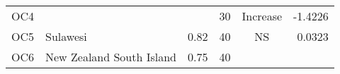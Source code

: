 \documentclass[]{article}
\begin{document}
\begin{longtable}[]{@{}clrccr@{}}
\begin{minipage}[t]{0.08\columnwidth}
OC4\strut
\end{minipage} & \begin{minipage}[t]{0.29\columnwidth}\raggedright\strut
\strut
\end{minipage} & \begin{minipage}[t]{0.11\columnwidth}\raggedleft\strut
\strut
\end{minipage} & \begin{minipage}[t]{0.10\columnwidth}\centering\strut
30\strut
\end{minipage} & \begin{minipage}[t]{0.16\columnwidth}\centering\strut
Increase\strut
\end{minipage} & \begin{minipage}[t]{0.09\columnwidth}\raggedleft\strut
-1.4226\strut
\end{minipage}\tabularnewline
\begin{minipage}[t]{0.08\columnwidth}\centering\strut
OC5\strut
\end{minipage} & \begin{minipage}[t]{0.29\columnwidth}\raggedright\strut
Sulawesi\strut
\end{minipage} & \begin{minipage}[t]{0.11\columnwidth}\raggedleft\strut
0.82\strut
\end{minipage} & \begin{minipage}[t]{0.10\columnwidth}\centering\strut
40\strut
\end{minipage} & \begin{minipage}[t]{0.16\columnwidth}\centering\strut
NS\strut
\end{minipage} & \begin{minipage}[t]{0.09\columnwidth}\raggedleft\strut
0.0323\strut
\end{minipage}\tabularnewline
\begin{minipage}[t]{0.08\columnwidth}\centering\strut
OC6\strut
\end{minipage} & \begin{minipage}[t]{0.29\columnwidth}\raggedright\strut
New Zealand South Island\strut
\end{minipage} & \begin{minipage}[t]{0.11\columnwidth}\raggedleft\strut
0.75\strut
\end{minipage} & \begin{minipage}[t]{0.10\columnwidth}\centering\strut
40\strut
\end{minipage} & \begin{minipage}[t]{0.16\columnwidth}\centering\strut

\end{minipage}
\end{longtable}
\end{document}
